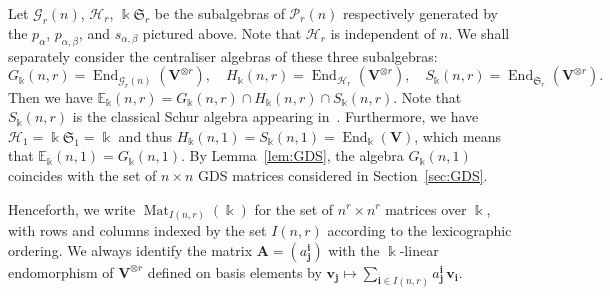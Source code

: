 \documentclass[ALCO,ThmDefs,Unicode,epreuves]{cedram}
\DeclareMathOperator{\End}{End}
\DeclareMathOperator{\Mat}{Mat}
\newcommand{\E}{\mathbb{E}}
\newcommand{\Sym}{\mathfrak{S}}
\newcommand{\GG}{\mathcal{G}}
\newcommand{\HH}{\mathcal{H}}
\newcommand{\Ptn}{\mathcal{P}}
\newcommand{\bi}{{\boldsymbol{i}}} %
\newcommand{\bj}{{\boldsymbol{j}}}
\newcommand{\bA}{\mathbf{A}}
\newcommand{\V}{\mathbf{V}} %
\newcommand{\bv}{\mathbf{v}} %
\begin{document}
Let $\GG_r(n)$, $\HH_r$, $\Bbbk\Sym_r$ be the subalgebras of
$\Ptn_r(n)$ respectively generated by the $p_\alpha$,
$p_{\alpha,\beta}$, and $s_{\alpha,\beta}$ pictured above. Note that
$\HH_r$ is independent of $n$. We shall separately consider the
centraliser algebras of these three subalgebras:
\[
G_\Bbbk(n,r) = \End_{\GG_r(n)}(\V^{\otimes r}), \quad
H_\Bbbk(n,r) = \End_{\HH_r} (\V^{\otimes r}), \quad %
S_\Bbbk(n,r) = \End_{\Sym_r} (\V^{\otimes r}).
\]
Then we have $\E_\Bbbk(n,r) = G_\Bbbk(n,r) \cap H_\Bbbk(n,r) \cap
S_\Bbbk(n,r)$. Note that $S_\Bbbk(n,r)$ is the classical Schur algebra
appearing in~\cite{Green:book}. Furthermore, we have
$\HH_1=\Bbbk\Sym_1=\Bbbk$ and thus
$H_\Bbbk(n,1)=S_\Bbbk(n,1)=\End_\Bbbk(\V)$, which means that
$\E_\Bbbk(n,1) = G_\Bbbk(n,1)$. By Lemma~\ref{lem:GDS}, the algebra
$G_\Bbbk(n,1)$ coincides with the set of $n \times n$ GDS matrices
considered in Section~\ref{sec:GDS}.

Henceforth, we write $\Mat_{I(n,r)}(\Bbbk)$ for the set of $n^r \times
n^r$ matrices over $\Bbbk$, with rows and columns indexed by the set
$I(n,r)$ according to the lexicographic ordering. We always identify
the matrix $\bA = (a^\bi_\bj)$ with the $\Bbbk$-linear endomorphism of
$\V^{\otimes r}$ defined on basis elements by $\bv_\bj \mapsto
\sum_{\bi \in I(n,r)} a^{\bi}_{\bj} \, \bv_{\bi}$.
\end{document}
